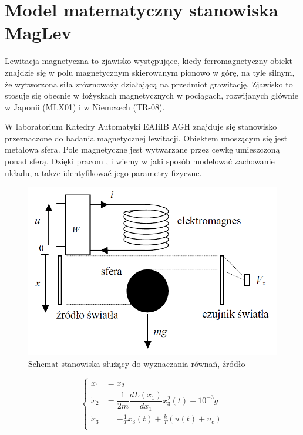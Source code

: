 \section{Model matematyczny stanowiska MagLev}

Lewitacja magnetyczna to zjawisko występujące, kiedy ferromagnetyczny obiekt znajdzie się w polu magnetycznym skierowanym pionowo w górę, na tyle silnym, że wytworzona siła zrównoważy działającą na przedmiot grawitację. Zjawisko to stosuje się obecnie w łożyskach magnetycznych w pociągach, rozwijanych głównie w Japonii (MLX01) i w Niemczech (TR-08).

W laboratorium Katedry Automatyki EAIiIB AGH znajduje się stanowisko przeznaczone do badania magnetycznej lewitacji. Obiektem unoszącym się jest metalowa sfera. Pole magnetyczne jest wytwarzane przez cewkę umieszczoną ponad sferą. Dzięki pracom \cite{Bania1999}, \cite{Bania2000} i \cite{Pilat} wiemy w jaki sposób modelować zachowanie układu, a także identyfikować jego parametry fizyczne.

\begin{figure}[!htb]
\centering
\includegraphics[scale=0.45]{img/model-rownania.PNG}
\caption{Schemat stanowiska służący do wyznaczania równań, źródło \cite{Bania2000}}
\label{rys:model-rownania}
\end{figure}

\begin{equation}\label{modelMagLev}
  \begin{cases}
    \dot x_1 & = x_2 \\
    \dot x_2 & = \dfrac{1}{2m} \dfrac{dL(x_1)}{dx_1} x_3^2(t) + 10^{-3} g  \\
    \dot x_3 & = -\frac{1}{T} x_3(t) + \frac{k}{T} (u(t) + u_c) \\
  \end{cases}  
\end{equation}

